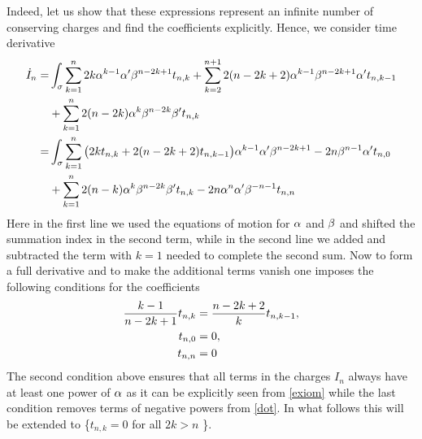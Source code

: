 \documentclass[12pt]{article}%
\numberwithin{equation}{section}
\begin{document}
Indeed, let us show that these expressions represent an infinite number of conserving charges and find the coefficients explicitly. Hence, we consider time derivative
\begin{equation}
\label{dot}
\begin{aligned}
\dot{I}_{n}=&\int_\sigma\sum_{k=1}^n2k\alpha^{k-1}\alpha'\beta^{n-2k+1}t_{n,k}+\sum_{k=2}^{n+1}2(n-2k+2)\alpha^{k-1}\beta^{n-2k+1}\alpha't_{n,k-1}\\
&+\sum_{k=1}^n2(n-2k)\alpha^k\beta^{n-2k}\beta' t_{n,k}\\
=&\int_\sigma \sum_{k=1}^n\big(2k t_{n,k}+2(n-2k+2)t_{n,k-1}\big)\alpha^{k-1}\alpha'\beta^{n-2k+1}-2n\beta^{n-1}\alpha't_{n,0}\\
&+\sum_{k=1}^n2(n-k)\alpha^k\beta^{n-2k}\beta' t_{n,k}-2n \alpha^n \alpha' \beta^{-n-1}t_{n,n}
\end{aligned}
\end{equation}
Here in the first line we used the equations of motion for $\alpha$ and $\beta$ and shifted the summation index in the second term, while in the second line we added and subtracted the term with $k=1$ needed to complete the second sum. Now to form a full derivative and to make the additional terms vanish one imposes the following conditions for the coefficients 
\begin{equation}
\label{t}
\begin{aligned}
 \frac{k-1}{n-2k+1}t_{n,k}&=\frac{n-2k+2}{k}t_{n,k-1},\\
 t_{n,0}&=0,\\
 t_{n,n}&=0
\end{aligned}
\end{equation}
The second condition above ensures that all terms in the charges $I_{n}$ always have at least one power of $\alpha$ as it can be explicitly seen from \eqref{exiom} while the last condition removes terms of negative powers from \eqref{dot}. In what follows this will be extended to \{$t_{n,k}=0$ for all $2k > n$ \}.
\end{document}
